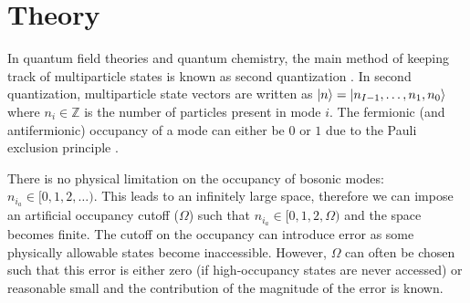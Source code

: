 \section{Theory}
\label{sec:theory}


In quantum field theories and quantum chemistry, the main method of keeping track of multiparticle states is known as second quantization \cite{Sakurai_Napolitano_2020}.
In second quantization, multiparticle state vectors are written as $\ket{n} = \ket{n_{I-1}, \dots, n_1, n_0}$ where $n_i \in \mathbb{Z}$ is the number of particles present in mode $i$.
The fermionic (and antifermionic) occupancy of a mode can either be $0$ or $1$ due to the Pauli exclusion principle \cite{pauli1925zusammenhang}.

There is no physical limitation on the occupancy of bosonic modes: $n_{i_a} \in [0, 1, 2, \dots)$.
This leads to an infinitely large space, therefore we can impose an artificial occupancy cutoff ($\Omega$) such that $n_{i_a} \in [0, 1, 2, \Omega)$ and the space becomes finite.
The cutoff on the occupancy can introduce error as some physically allowable states become inaccessible.
However, $\Omega$ can often be chosen such that this error is either zero (if high-occupancy states are never accessed) or reasonable small and the contribution of the magnitude of the error is known. 

